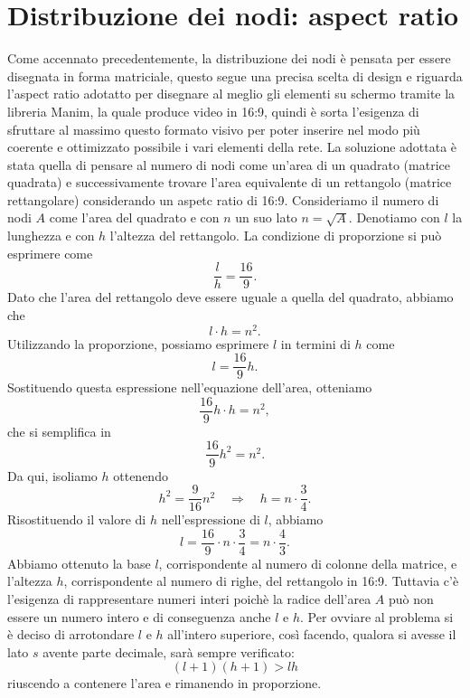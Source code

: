 \documentclass[binding=0.6cm]{sapthesis}
\begin{document}
\section{Distribuzione dei nodi: aspect ratio}
\label{sec:aspect_ratio}
Come accennato precedentemente, la distribuzione dei nodi è pensata per essere disegnata in forma matriciale, questo segue una precisa scelta di design e riguarda
l'aspect ratio adotatto per disegnare al meglio gli elementi su schermo tramite la libreria Manim, la quale produce video in 16:9, quindi è sorta l'esigenza
di sfruttare al massimo questo formato visivo per poter inserire nel modo più coerente e ottimizzato possibile i vari elementi della rete.
La soluzione adottata è stata quella di pensare al numero di nodi come un'area di un quadrato (matrice quadrata) e successivamente trovare l'area equivalente 
di un rettangolo (matrice rettangolare) considerando un
aspetc ratio di 16:9. Consideriamo il numero di nodi \(A\) come l'area del quadrato e con \(n\) un suo lato \(n = \sqrt{A}\).
Denotiamo con $l$ la lunghezza e con $h$ l'altezza del rettangolo. La condizione di proporzione si può esprimere come
\[
\frac{l}{h} = \frac{16}{9}.
\]
Dato che l'area del rettangolo deve essere uguale a quella del quadrato, abbiamo che
\[
l \cdot h = n^2.
\]
Utilizzando la proporzione, possiamo esprimere $l$ in termini di $h$ come
\[
l = \frac{16}{9}h.
\]
Sostituendo questa espressione nell'equazione dell'area, otteniamo
\[
\frac{16}{9}h \cdot h = n^2,
\]
che si semplifica in
\[
\frac{16}{9}h^2 = n^2.
\]
Da qui, isoliamo $h$ ottenendo
\[
h^2 = \frac{9}{16}n^2 \quad \Longrightarrow \quad h = n \cdot \frac{3}{4}.
\]
Risostituendo il valore di $h$ nell'espressione di $l$, abbiamo
\[
l = \frac{16}{9} \cdot n \cdot \frac{3}{4} = n \cdot \frac{4}{3}.
\]
Abbiamo ottenuto la base \(l\), corrispondente al numero di colonne della matrice, e l'altezza \(h\), corrispondente al numero
di righe, del rettangolo in 16:9. Tuttavia c'è l'esigenza di rappresentare numeri interi poichè la radice dell'area \(A\) può non essere un numero intero e di conseguenza anche \(l\) e \(h\).
Per ovviare al problema si è deciso di arrotondare \(l\) e \(h\) all'intero superiore, così facendo, qualora si avesse
il lato \(s\) avente parte decimale, sarà sempre verificato:
\begin{equation}
    (l+1)(h+1)>lh
\end{equation}
riuscendo a contenere l'area e rimanendo in proporzione.
\end{document}
